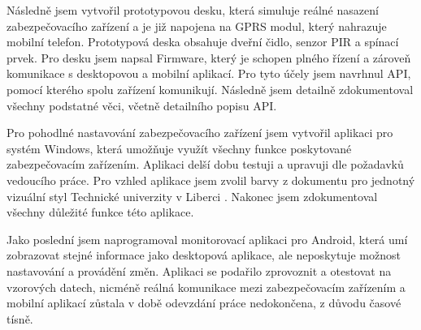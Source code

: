 \documentclass[FM,MP]{tulthesis}  %
\begin{document}
Následně jsem vytvořil prototypovou desku, která simuluje reálné nasazení zabezpečovacího zařízení a je již napojena na GPRS modul, který nahrazuje mobilní telefon. Prototypová deska obsahuje dveřní čidlo, senzor PIR a spínací prvek. Pro desku jsem napsal Firmware, který je schopen plného řízení a zároveň komunikace s desktopovou a mobilní aplikací. Pro tyto účely jsem navrhnul API, pomocí kterého spolu zařízení komunikují. Následně jsem detailně zdokumentoval všechny podstatné věci, včetně detailního popisu API.

Pro pohodlné nastavování zabezpečovacího zařízení jsem vytvořil aplikaci pro systém Windows, která umožňuje využít všechny funkce poskytované zabezpečovacím zařízením. Aplikaci delší dobu testuji a upravuji dle požadavků vedoucího práce. Pro vzhled aplikace jsem zvolil barvy z dokumentu pro jednotný vizuální styl Technické univerzity v Liberci \cite{TULVisual}. Nakonec jsem zdokumentoval všechny důležité funkce této aplikace.

Jako poslední jsem naprogramoval monitorovací aplikaci pro Android, která umí zobrazovat stejné informace jako desktopová aplikace, ale neposkytuje možnost nastavování a provádění změn. Aplikaci se podařilo zprovoznit a otestovat na vzorových datech, nicméně reálná komunikace mezi zabezpečovacím zařízením a mobilní aplikací zůstala v době odevzdání práce nedokončena, z důvodu časové tísně.

\end{document}
